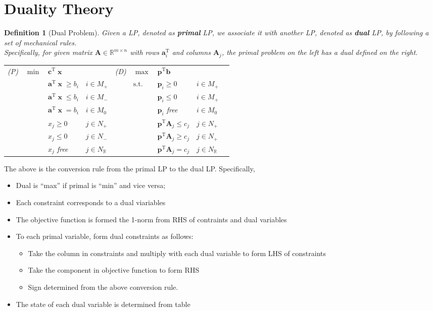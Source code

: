 \documentclass[12pt]{article}
\newcommand{\st}{\mathrm{s.t.}}
\newcommand{\T}{\mathrm{T}}
\newtheorem{definition}{Definition}[section]
\theoremstyle{definition}
\DeclareMathOperator{\x}{\mathbf{x}}
\begin{document}
\section{Duality Theory}
\begin{definition}[Dual Problem]
Given a LP, denoted as \textbf{primal} LP, we associate it with another LP, denoted as \textbf{dual} LP, by following a set of mechanical rules.\\
Specifically, for given matrix $\mathbf{A}\in\mathbb{R}^{m\times n}$ with rows $\mathbf{a}_i^\T$ and columns $\mathbf{A}_j$, the primal problem on the left has a dual defined on the right.
\begin{table}[h]
\centering
\begin{tabular}{lllllllll}
(P) &$\min$ &$\mathbf{c}^\T\x$        &           &(D)  &$\max$ &$\mathbf{p}^\T\mathbf{b}$                &&\\
    &       &$\mathbf{a}^\T\x\geq b_i$&$i\in M_+$ &     &$\st$  &$\mathbf{p}_i\geq 0$                     &$i\in M_+$\\
    &       &$\mathbf{a}^\T\x\leq b_i$&$i\in M_-$ &     &       &$\mathbf{p}_i\leq 0$                     &$i\in M_+$\\
    &       &$\mathbf{a}^\T\x= b_i$   &$i\in M_0$ &     &       &$\mathbf{p}_i$ free                      &$i\in M_0$\\
    &       &$x_j\geq 0$              &$j\in N_+$ &     &       &$\mathbf{p}^\T\mathbf{A}_j\leq c_j$      &$j\in N_+$\\
    &       &$x_j\leq 0$              &$j\in N_-$ &     &       &$\mathbf{p}^\T\mathbf{A}_j\geq c_j$      &$j\in N_+$\\
    &       &$x_j$ free               &$j\in N_\mathbb{R}$ &     &       &$\mathbf{p}^\T\mathbf{A}_j=c_j$      &$j\in N_\mathbb{R}$\\
\end{tabular}
\end{table}
\end{definition}
The above is the conversion rule from the primal LP to the dual LP. Specifically,
\begin{itemize}
  \item Dual is ``max'' if primal is ``min'' and vice versa;
  \item Each constraint corresponds to a dual viariables
  \item The objective function is formed the 1-norm from RHS of contraints and dual variables
  \item To each primal variable, form dual constraints as follows:
  \begin{itemize}
    \item Take the column in constraints and multiply with each dual variable to form LHS of constraints
    \item Take the component in objective function to form RHS
    \item Sign determined from the above conversion rule.
  \end{itemize}
  \item The state of each dual variable is determined from table
\end{itemize}
\end{document}
